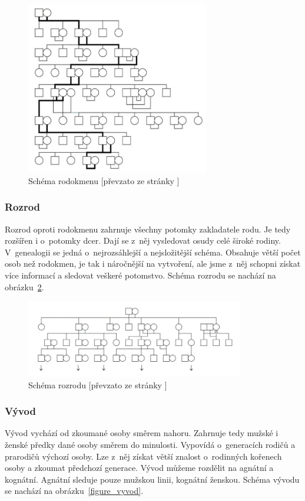 \begin{figure}[H]
	\centering
	\includegraphics[width=80mm]{obrazky-figures/rodokmen.jpg}
	\caption[Schéma rodokmenu]{Schéma rodokmenu [převzato ze stránky \cite{schema}]}
	\label{figure_rodokmen}
\end{figure}

\subsubsection{Rozrod}
Rozrod oproti rodokmenu zahrnuje všechny potomky zakladatele rodu. Je tedy rozšířen i o~potomky dcer. Dají se z~něj vysledovat osudy celé široké rodiny. V~genealogii se jedná o~nejrozsáhlejší a nejsložitější schéma. Obsahuje větší počet osob než rodokmen, je tak i náročnější na vytvoření, ale jsme z~něj schopni získat více informací a sledovat veškeré potomstvo. Schéma rozrodu se nachází na obrázku~\ref{figure_rozrod}.

\begin{figure}[H]
	\centering
	\includegraphics[width=95mm]{obrazky-figures/rozrod.jpg}
	\caption[Schéma rozrodu]{Schéma rozrodu [převzato ze stránky \cite{schema}]}
	\label{figure_rozrod}
\end{figure}

\subsubsection{Vývod}
Vývod vychází od zkoumané osoby směrem nahoru. Zahrnuje tedy mužské i ženské předky dané osoby směrem do minulosti. Vypovídá o~generacích rodičů a prarodičů výchozí osoby. Lze z~něj získat větší znalost o~rodinných kořenech osoby a zkoumat předchozí generace. Vývod můžeme rozdělit na agnátní a kognátní. Agnátní sleduje pouze mužskou linii, kognátní ženskou. Schéma vývodu se nachází na obrázku~\ref{figure_vyvod}.

